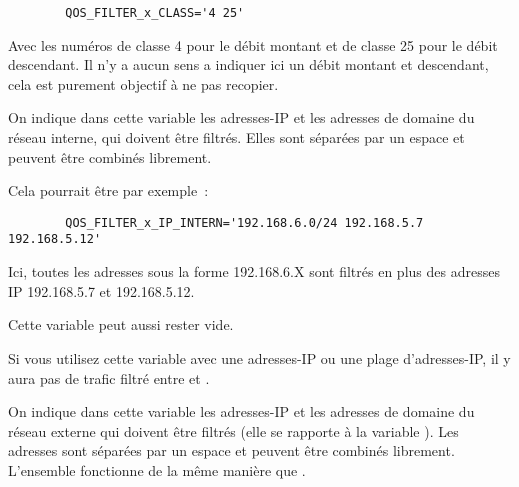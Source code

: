 \begin{description}
\begin{example}
\begin{verbatim}
        QOS_FILTER_x_CLASS='4 25'
\end{verbatim}
\end{example}

    Avec les numéros de classe 4 pour le débit montant et de classe 25 pour le
    débit descendant. Il n'y a aucun sens a indiquer ici un débit montant et
    descendant, cela est purement objectif à ne pas recopier.


    On indique dans cette variable les adresses-IP et les adresses
    de domaine du réseau interne, qui doivent être filtrés. Elles sont
    séparées par un espace et peuvent être combinés librement.

    Cela pourrait être par exemple~:

\begin{example}
\begin{verbatim}
        QOS_FILTER_x_IP_INTERN='192.168.6.0/24 192.168.5.7 192.168.5.12'
\end{verbatim}
\end{example}

    Ici, toutes les adresses sous la forme 192.168.6.X sont filtrés
    en plus des adresses IP 192.168.5.7 et 192.168.5.12.

    Cette variable peut aussi rester vide.

    Si vous utilisez cette variable 
    avec une adresses-IP ou une plage d'adresses-IP, il y aura pas
    de trafic filtré entre  et
    .

    \sloppypar{}


    On indique dans cette variable les adresses-IP et les adresses de
    domaine du réseau externe qui doivent être filtrés (elle se rapporte
    à la variable ). Les adresses sont séparées
    par un espace et peuvent être combinés librement. L'ensemble fonctionne
    de la même manière que .


\end{description}
